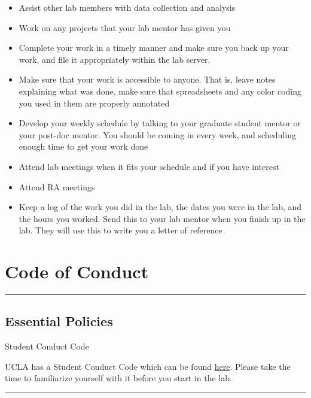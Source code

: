 \documentclass[]{book}
\providecommand{\tightlist}{%
  \setlength{\itemsep}{0pt}\setlength{\parskip}{0pt}}
\begin{document}
\begin{itemize}
\tightlist
\item
  Assist other lab members with data collection and analysis
\item
  Work on any projects that your lab mentor has given you
\item
  Complete your work in a timely manner and make sure you back up your work, and file it appropriately within the lab server.
\item
  Make sure that your work is accessible to anyone. That is, leave notes explaining what was done, make sure that spreadsheets and any color coding you used in them are properly annotated
\item
  Develop your weekly schedule by talking to your graduate student mentor or your post-doc mentor. You should be coming in every week, and scheduling enough time to get your work done
\item
  Attend lab meetings when it fits your schedule and if you have interest
\item
  Attend RA meetings
\item
  Keep a log of the work you did in the lab, the dates you were in the lab, and the hours you worked. Send this to your lab mentor when you finish up in the lab. They will use this to write you a letter of reference
\end{itemize}

\hypertarget{code-of-conduct}{%
\chapter{Code of Conduct}\label{code-of-conduct}}

\begin{center}\rule{0.5\linewidth}{0.5pt}\end{center}

\hypertarget{essential-policies}{%
\section{Essential Policies}\label{essential-policies}}

Student Conduct Code

UCLA has a Student Conduct Code which can be found \href{https://www.deanofstudents.ucla.edu/Individual-Student-Code}{here}. Please take the time to familiarize yourself with it before you start in the lab.

\begin{center}\rule{0.5\linewidth}{0.5pt}\end{center}
\end{document}
